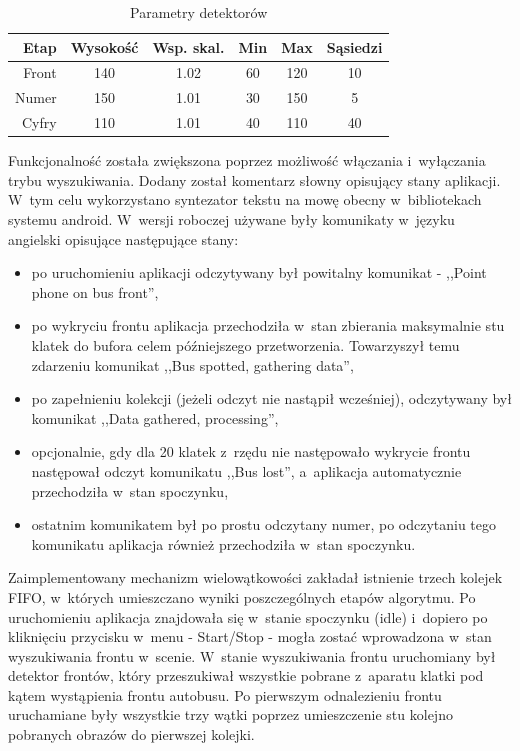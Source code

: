 \begin{table}[!h]
    \centering
    \begin{tabular}{r c c c c c }
        Etap    & Wysokość  & Wsp. skal.    & Min   & Max   & Sąsiedzi \\ \hline
        Front   & 140       & 1.02          & 60    & 120   & 10 \\
        Numer   & 150       & 1.01          & 30    & 150   & 5 \\
        Cyfry   & 110       & 1.01          & 40    & 110   & 40
    \end{tabular}
    \caption{Parametry detektorów}
    \label{tab:imp_det_params}
\end{table}

Funkcjonalność została zwiększona poprzez możliwość włączania i~wyłączania
trybu wyszukiwania. Dodany został komentarz słowny opisujący stany 
aplikacji. W~tym celu wykorzystano syntezator tekstu na mowę
obecny w~bibliotekach systemu android. W~wersji roboczej używane
były komunikaty w~języku angielski opisujące następujące stany:

\begin{itemize}
    \item po uruchomieniu aplikacji odczytywany był powitalny komunikat -
        ,,Point phone on bus front'',
    \item po wykryciu frontu aplikacja przechodziła w~stan zbierania
        maksymalnie stu klatek do bufora celem późniejszego przetworzenia.
        Towarzyszył temu zdarzeniu komunikat ,,Bus spotted, gathering
        data'',
    \item po zapełnieniu kolekcji (jeżeli odczyt nie nastąpił wcześniej),
        odczytywany był komunikat ,,Data gathered, processing'',
    \item opcjonalnie, gdy dla 20 klatek z~rzędu nie następowało wykrycie
        frontu następował odczyt komunikatu ,,Bus lost'', a~aplikacja
        automatycznie przechodziła w~stan spoczynku,
    \item ostatnim komunikatem był po prostu odczytany numer, po 
        odczytaniu tego komunikatu aplikacja również przechodziła
        w~stan spoczynku.
\end{itemize}

Zaimplementowany
mechanizm wielowątkowości zakładał istnienie trzech kolejek FIFO,
w~których umieszczano wyniki poszczególnych etapów algorytmu.
Po uruchomieniu aplikacja znajdowała się w~stanie spoczynku (idle)
i~dopiero po kliknięciu przycisku w~menu - Start/Stop - mogła
zostać wprowadzona w~stan wyszukiwania frontu w~scenie.
W~stanie wyszukiwania frontu uruchomiany był detektor frontów,
który przeszukiwał wszystkie pobrane z~aparatu klatki pod kątem
wystąpienia frontu autobusu. Po pierwszym odnalezieniu frontu
uruchamiane były wszystkie trzy wątki poprzez umieszczenie
stu kolejno pobranych obrazów do pierwszej kolejki.

